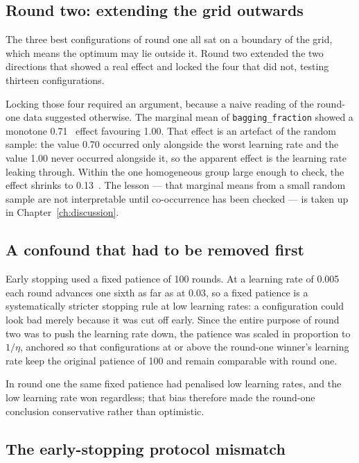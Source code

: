 \subsection{Round two: extending the grid outwards}

The three best configurations of round one all sat on a boundary of the grid, which means
the optimum may lie outside it. Round two extended the two directions that showed a real
effect and locked the four that did not, testing thirteen configurations.

Locking those four required an argument, because a naive reading of the round-one data
suggested otherwise. The marginal mean of \verb+bagging_fraction+ showed a monotone
0.71~\pp{} effect favouring 1.00. That effect is an artefact of the random sample: the
value 0.70 occurred only alongside the worst learning rate and the value 1.00 never
occurred alongside it, so the apparent effect is the learning rate leaking through. Within
the one homogeneous group large enough to check, the effect shrinks to 0.13~\pp{}. The
lesson --- that marginal means from a small random sample are not interpretable until
co-occurrence has been checked --- is taken up in Chapter~\ref{ch:discussion}.

\subsection{A confound that had to be removed first}

Early stopping used a fixed patience of 100 rounds. At a learning rate of 0.005 each round
advances one sixth as far as at 0.03, so a fixed patience is a systematically stricter
stopping rule at low learning rates: a configuration could look bad merely because it was
cut off early. Since the entire purpose of round two was to push the learning rate down,
the patience was scaled in proportion to $1/\eta$, anchored so that configurations at or
above the round-one winner's learning rate keep the original patience of 100 and remain
comparable with round one.

In round one the same fixed patience had penalised low learning rates, and the low
learning rate won regardless; that bias therefore made the round-one conclusion
conservative rather than optimistic.

\subsection{The early-stopping protocol mismatch}
\label{sec:exp-esmismatch}

